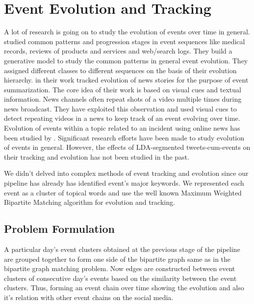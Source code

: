 \chapter{Event Evolution and Tracking}
A lot of research is going on to study the evolution of events over time in general. \cite{yang2014finding} studied common patterns and progression stages in event sequences like medical records, reviews of products and services and web/search logs. They build a generative model to study the common patterns in general event evolution. They assigned different classes to different sequences on the basis of their evolution hierarchy. \cite{duygulu2004towards} in their work tracked evolution of news stories for the purpose of event summarization. The core idea of their work is based on visual cues and textual information. News channels often repeat shots of a video multiple times during news broadcast. They have exploited this observation and used visual cues to detect repeating videos in a news to keep track of an event evolving over time. Evolution of events within a topic related to an incident using online news has been studied by \cite{yang2009discovering}. Significant research efforts have been made to study evolution of events in general. However, the effects of LDA-segmented tweets-cum-events on their tracking and evolution has not been studied in the past.

We didn't delved into complex methods of event tracking and evolution since our pipeline has already has identified event's major keywords. We represented each event as a cluster of topical words and use the well known Maximum Weighted Bipartite Matching algorithm for evolution and tracking.

\section{Problem Formulation}

A particular day’s event clusters obtained at the previous stage of the pipeline are grouped together to form one side of the bipartite graph same as in the bipartite graph matching problem. Now edges are constructed between event clusters of consecutive day’s events based on the similarity between the event clusters. Thus, forming an event chain over time showing the evolution and also it’s relation with other event chains on the social media.

